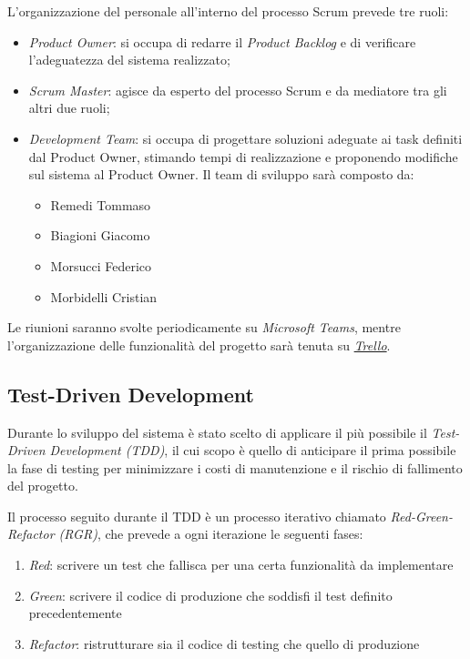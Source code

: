 L'organizzazione del personale all'interno del processo Scrum prevede tre ruoli:
\begin{itemize}
    \item \textit{Product Owner}: si occupa di redarre il \textit{Product Backlog} e di verificare l'adeguatezza del
    sistema realizzato;
    \item \textit{Scrum Master}: agisce da esperto del processo Scrum e da mediatore tra gli altri due ruoli;
    \item \textit{Development Team}: si occupa di progettare soluzioni adeguate ai task definiti dal Product
    Owner, stimando tempi di realizzazione e proponendo modifiche sul sistema al Product Owner.
    Il team di sviluppo sarà composto da:
    \begin{itemize}
        \item Remedi Tommaso
        \item Biagioni Giacomo
        \item Morsucci Federico
        \item Morbidelli Cristian
    \end{itemize}
\end{itemize}

Le riunioni saranno svolte periodicamente su \textit{Microsoft Teams}, mentre l'organizzazione
delle funzionalità del progetto sarà tenuta su \href{https://trello.com/b/2mgr8e1j/pps}{\textit{Trello}}.

\subsection{Test-Driven Development}
Durante lo sviluppo del sistema è stato scelto di applicare il più possibile il \textit{Test-Driven Development (TDD)},
il cui scopo è quello di anticipare il prima possibile la fase di testing per minimizzare i costi di manutenzione e
il rischio di fallimento del progetto.

Il processo seguito durante il TDD è un processo iterativo chiamato \textit{Red-Green-Refactor (RGR)}, che prevede a ogni
iterazione le seguenti fases:
\begin{enumerate}
    \item \textit{Red}: scrivere un test che fallisca per una certa funzionalità da implementare
    \item \textit{Green}: scrivere il codice di produzione che soddisfi il test definito precedentemente
    \item \textit{Refactor}: ristrutturare sia il codice di testing che quello di produzione
\end{enumerate}

